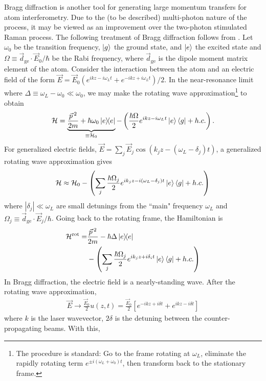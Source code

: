 \documentclass[reprint,
nofootinbib,
amsmath,amssymb,
aps]{revtex4-1}
\newcommand{\f}[2]{\frac{#1}{#2}}
\newcommand{\lp}{\left(}
\newcommand{\rp}{\right)}
\newcommand{\lb}{\left[}
\newcommand{\rb}{\right]}
\begin{document}
Bragg diffraction is another tool for generating large momentum transfers for atom interferometry. Due to the (to be described) multi-photon nature of the process, it may be viewed as an improvement over the two-photon stimulated Raman process.  The following treatment of Bragg diffraction follows from \cite{estey2016precision}. Let $\omega_0$ be the transition frequency, $\ket{g}$  the ground state, and $\ket{e}$  the excited state and $\Omega \equiv \vec{d}_\text{ge}\cdot \vec{E}_0/\hbar$ be the Rabi frequency, where $\vec{d}_\text{ge}$ is the dipole moment matrix element of the atom. Consider the interaction between the atom and an electric field of the form $\vec{E} = \vec{E}_0(e^{ikz - i \omega_Lt} + e^{-ikz+i\omega_Lt}) /2 $.  In the near-resonance limit where $\Delta \equiv \omega_L - \omega_0 \ll \omega_0$, we may make the rotating wave approximation\footnote{The procedure is standard: Go to the frame rotating at $\omega_L$, eliminate the rapidly rotating term $e^{\pm i(\omega_L+\omega_0)t}$, then transform back to the stationary frame.} to obtain 
\begin{align*}
\mathcal{H} = \underbrace{\f{\vec{p}\,^2}{2m} + \hbar \omega_0 \ketbra{e}}_{\equiv\mathcal{H}_0} - \lp \f{\hbar\Omega}{2}e^{ikz - i\omega_Lt} \ket{e}\bra{g} + h.c.\rp.
\end{align*}
For generalized electric fields, $\vec{E} = \sum_j \vec{E}_j \cos(k_j z - (\omega_L - \delta_j)t)$, a generalized rotating wave approximation gives
\begin{align*}
\mathcal{H} \approx \mathcal{H}_0 -  \lp \sum_j \f{\hbar\Omega_j}{2} e^{ik_j z - i(\omega_L - \delta_j) t} \ket{e}\bra{g} + h.c. \rp
\end{align*}
where $|\delta_j|\ll \omega_L$ are small detunings from the ``main" frequency $\omega_L$ and $\Omega_j \equiv \vec{d}_\text{ge}\cdot \vec{E}_j / \hbar$. Going back to the rotating frame, the Hamiltonian is 
\begin{align*}
\mathcal{H}^\text{rot} = &\f{\vec{p}\,^2}{2m} - \hbar \Delta \ketbra{e} \\
&- \lp \sum_j \f{\hbar \Omega_j}{2} e^{ik_jz + i \delta_i t} \ket{e}\bra{g} + h.c. \rp
\end{align*}
In Bragg diffraction, the electric field is a nearly-standing wave. After the rotating wave approximation, 
\begin{align}\label{eq:u}
\vec{E} \to \f{\vec{E}_0}{2}u(z,t) = \f{\vec{E}_0}{2} \lb  e^{-ikz + i\delta t} + e^{ikz-i\delta t}\rb
\end{align}
where $k$ is the laser wavevector, $2\delta$ is the detuning between the counter-propagating beams. With this, 
\end{document}
